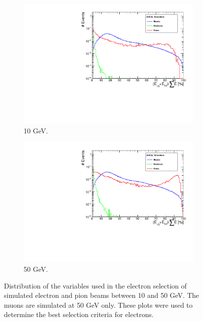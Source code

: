 \begin{figure}[htbp!]
\begin{subfigure}[t]{0.5\textwidth}
		\includegraphics[width=1\linewidth]{../Thesis_Plots/Timing/Electrons/Plots/SelectionCut_EnergyLastLayers_10GeV}
		\caption{10 GeV.} \label{fig:e10GeV_Elast}
	\end{subfigure}
	\hfill
	\begin{subfigure}[t]{0.5\textwidth}
		\centering
		\includegraphics[width=1\linewidth]{../Thesis_Plots/Timing/Electrons/Plots/SelectionCut_EnergyLastLayers_50GeV}
		\caption{50 GeV.} \label{fig:e50GeV_Elast}
	\end{subfigure}
	\caption{Distribution of the variables used in the electron selection of simulated electron and pion beams between 10 and 50 GeV. The muons are simulated at 50 GeV only. These plots were used to determine the best selection criteria for electrons.} \label{fig:electronselection}
\end{figure}

